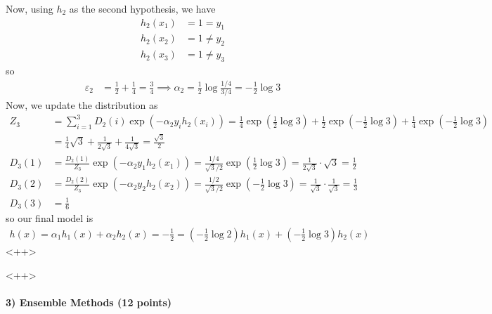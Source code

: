 \documentclass{article}
\begin{document}
\begin{soln}
	Now, using $h_2$ as the second hypothesis, we have
	\begin{align*}
		h_2(x_1) &= 1 = y_1 \\
		h_2(x_2) &= 1 \neq y_2 \\
		h_2(x_3) &= 1 \neq y_3
	\end{align*}
	so
	\begin{align*}
		\varepsilon_2 &= \frac{1}{2} + \frac{1}{4} = \frac{3}{4} \implies \alpha_2 = \frac{1}{2} \log \frac{1/4}{3/4} = -\frac{1}{2}\log 3
	\end{align*}
	Now, we update the distribution as
	\begin{align*}
		Z_3 &= \sum_{i=1}^{3} D_2(i)\exp\left( -\alpha_2 y_i h_2(x_i) \right) = \frac{1}{4}\exp\left( \frac{1}{2}\log 3 \right) + \frac{1}{2}\exp\left( -\frac{1}{2}\log 3 \right) + \frac{1}{4}\exp\left( -\frac{1}{2}\log 3 \right) \\
		&= \frac{1}{4} \sqrt{3} + \frac{1}{2\sqrt{3}} + \frac{1}{4\sqrt{3}} = \frac{\sqrt{3}}{2} \\
		D_3(1) &= \frac{D_2(1)}{Z_3}\exp\left( -\alpha_2 y_1 h_2(x_1) \right) = \frac{1/4}{\sqrt{3}/2}\exp\left( \frac{1}{2}\log 3 \right) = \frac{1}{2\sqrt{3}}\cdot\sqrt{3} = \frac{1}{2} \\
		D_3(2) &= \frac{D_2(2)}{Z_3}\exp\left( -\alpha_2 y_2h_2(x_2) \right) = \frac{1/2}{\sqrt{3}/2}\exp\left( -\frac{1}{2}\log 3 \right) = \frac{1}{\sqrt{3}}\cdot \frac{1}{\sqrt{3}} = \frac{1}{3} \\
		D_3(3) &= \frac{1}{6}
	\end{align*}
	so our final model is
	\begin{align*}
		h(x) = \alpha_1h_1(x) + \alpha_2h_2(x) = -\frac{1}{2} = \left( -\frac{1}{2}\log 2 \right) h_1(x) + \left( -\frac{1}{2}\log 3 \right) h_2(x)
	\end{align*}<++>
\end{soln}<++>

\paragraph{3) Ensemble Methods (12 points)}
\end{document}
